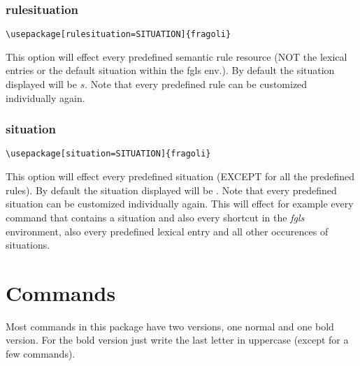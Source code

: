 \documentclass[10pt, a4paper]{article}
\begin{document}
	\subsubsection{rulesituation}
	\begin{lstlisting}[style=A]
			\usepackage[rulesituation=SITUATION]{fragoli}
	\end{lstlisting}
	This option will effect every predefined semantic rule resource (NOT the lexical entries or the default situation within the fgls env.). By default the situation displayed will be $s$. Note that every predefined rule can be customized individually again.
	\subsubsection{situation}
	\begin{lstlisting}[style=A]
			\usepackage[situation=SITUATION]{fragoli}
	\end{lstlisting}
	This option will effect every predefined situation (EXCEPT for all the predefined rules). By default the situation displayed will be \sstar. Note that every predefined situation can be customized individually again. This will effect for example every command that contains a situation and also every shortcut in the \textit{fgls} environment, also every predefined lexical entry and all other occurences of situations.
	\section{Commands}
	Most commands in this package have two versions, one normal and one bold version. For the bold version just write the last letter in uppercase (except for a few commands).
\end{document}
